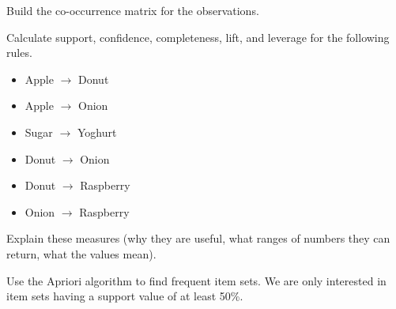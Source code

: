 \documentclass[fontsize=12pt, usenames, dvipsnames, headinclude, headsepline, footinclude, footsepline]{scrartcl}
\title{\normalfont{\bfseries{Machine Learning: Homework 7}}}
\author{Laurent \textsc{Hayez}}
\date{\today}
\begin{document}
\renewcommand{\labelitemi}{\textbullet}



\maketitle




\begin{exo}
  Build the co-occurrence matrix for the observations.

Calculate support, confidence, completeness, lift, and leverage for the following rules.
\begin{itemize}
\item Apple $\to$ Donut 
\item Apple $\to$ Onion 
\item Sugar $\to$ Yoghurt 
\item Donut $\to$ Onion 
\item Donut $\to$ Raspberry 
\item Onion $\to$ Raspberry
\end{itemize}

Explain these measures (why they are useful, what ranges of numbers they can return, what the values mean).

Use the Apriori algorithm to find frequent item sets. We are only interested in item sets having a support value of at least 50\%.

\end{exo}
\end{document}
